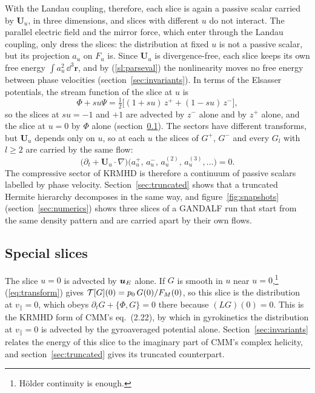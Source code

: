 With the Landau coupling, therefore, each slice is again a passive scalar carried by $\boldsymbol U_u$, in three dimensions, and slices with different $u$ do not interact. The parallel electric field and the mirror force, which enter through the Landau coupling, only dress the slices: the distribution at fixed $u$ is not a passive scalar, but its projection $a_u$ on $F_u$ is. Since $\boldsymbol U_u$ is divergence-free, each slice keeps its own free energy $\int a_u^2\,\dd^3\boldsymbol r$, and by (\ref{sl:parseval}) the nonlinearity moves no free energy between phase velocities (section~\ref{sec:invariants}). In terms of the Elsasser potentials, the stream function of the slice at $u$ is
\begin{equation}\label{eq:elsasserpot}
  \Phi+su\Psi=\tfrac12\big[(1+su)\,z^++(1-su)\,z^-\big],
\end{equation}
so the slices at $su=-1$ and $+1$ are advected by $z^-$ alone and by $z^+$ alone, and the slice at $u=0$ by $\Phi$ alone (section~\ref{sl:special}). The sectors have different transforms, but $\boldsymbol U_u$ depends only on $u$, so at each $u$ the slices of $G^+$, $G^-$ and every $G_l$ with $l\ge2$ are carried by the same flow:
\begin{equation}\label{eq:sameflow}
  \big(\partial_t+\boldsymbol U_u\cdot\nabla\big)\big(a^+_u,\,a^-_u,\,a^{(2)}_u,\,a^{(3)}_u,\dots\big)=0 .
\end{equation}
The compressive sector of KRMHD is therefore a continuum of passive scalars labelled by phase velocity. Section~\ref{sec:truncated} shows that a truncated Hermite hierarchy decomposes in the same way, and figure~\ref{fig:snapshots} (section~\ref{sec:numerics}) shows three slices of a GANDALF run that start from the same density pattern and are carried apart by their own flows.

\subsection{Special slices}\label{sl:special}

The slice $u=0$ is advected by $\boldsymbol u_E$ alone. If $G$ is smooth in $u$ near $u=0$,\footnote{H\"older continuity is enough.} (\ref{eq:transform}) gives $\mathcal T[G](0)=p_0\,G(0)/F_M(0)$, so this slice is the distribution at $v_\parallel=0$, which obeys $\partial_tG+\{\Phi,G\}=0$ there because $(LG)(0)=0$. This is the KRMHD form of CMM's eq.~(2.22), by which in gyrokinetics the distribution at $v_\parallel=0$ is advected by the gyroaveraged potential alone. Section~\ref{sec:invariants} relates the energy of this slice to the imaginary part of CMM's complex helicity, and section~\ref{sec:truncated} gives its truncated counterpart.


